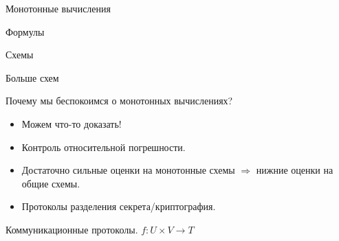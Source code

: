 \begin{frame}{Монотонные вычисления}

    \begin{minipage}{0.33\linewidth}
        \centering
        Формулы
        \vspace{0.2cm}
        
        
    \end{minipage}
    \begin{minipage}{0.33\linewidth}
        \centering
        Схемы
        \vspace{0.2cm}
        
        
    \end{minipage}
    \begin{minipage}{0.32\linewidth}
        \centering
        Больше схем
        \vspace{0.2cm}
        
        
    \end{minipage}

    \pause
    Почему мы беспокоимся о монотонных вычислениях?
    \begin{itemize}
        \item Можем что-то доказать!
            \pause
        \item Контроль относительной погрешности.
            \pause
        \item Достаточно сильные оценки на монотонные схемы $\Rightarrow$ нижние оценки на общие схемы.
            \pause
        \item Протоколы разделения секрета/криптография.
    \end{itemize}
\end{frame}


\begin{frame}{Коммуникационные протоколы. $f\colon U \times V \to T$}
    \begin{center}
    	    
    \end{center}

    \pause
    \pause
    \pause
\end{frame}

